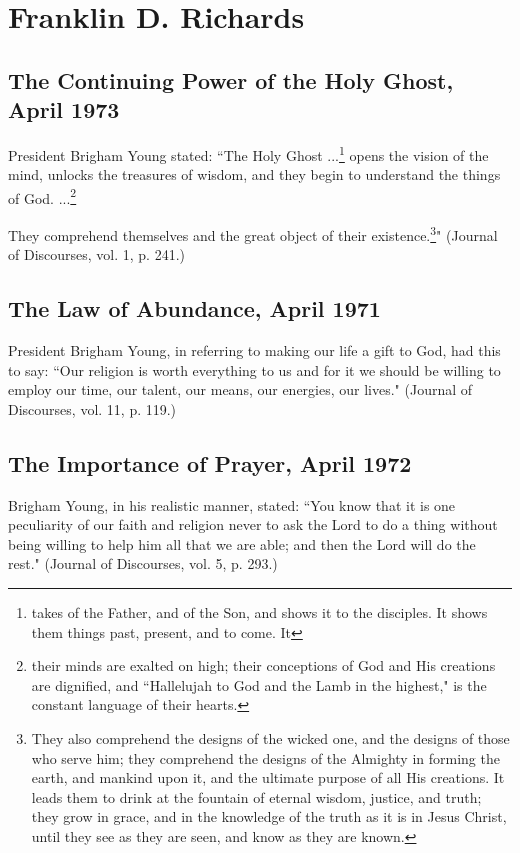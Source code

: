 \section{Franklin D. Richards}

\subsection{The Continuing Power of the Holy Ghost, April 1973}

President Brigham Young stated: ``The Holy Ghost ...\footnote{takes of the Father, and of the Son, and shows it to the disciples. It shows them things past, present, and to come. It} opens the vision of the mind, unlocks the treasures of wisdom, and they begin to understand the things of God. ...\footnote{their minds are exalted on high; their conceptions of God and His creations are dignified, and ``Hallelujah to God and the Lamb in the highest," is the constant language of their hearts.}

They comprehend themselves and the great object of their existence.\footnote{They also comprehend the designs of the wicked one, and the designs of those who serve him; they comprehend the designs of the Almighty in forming the earth, and mankind upon it, and the ultimate purpose of all His creations. It leads them to drink at the fountain of eternal wisdom, justice, and truth; they grow in grace, and in the knowledge of the truth as it is in Jesus Christ, until they see as they are seen, and know as they are known. }" (Journal of Discourses, vol. 1, p. 241.)

\subsection{The Law of Abundance, April 1971}

President Brigham Young, in referring to making our life a gift to God, had this to say: ``Our religion is worth everything to us and for it we should be willing to employ our time, our talent, our means, our energies, our lives." (Journal of Discourses, vol. 11, p. 119.)

\subsection{The Importance of Prayer, April 1972}

Brigham Young, in his realistic manner, stated: ``You know that it is one peculiarity of our faith and religion never to ask the Lord to do a thing without being willing to help him all that we are able; and then the Lord will do the rest." (Journal of Discourses, vol. 5, p. 293.)

